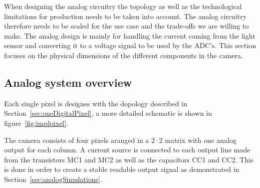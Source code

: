 
When designing the analog circuitry the topology as well as the technological limitations for production needs to be taken into account. The analog circuitry therefore needs to be scaled for the use case and the trade-offs we are willing to make.
The analog design is mainly for handling the current coming from the light sensor and converting it to a voltage signal to be used by the ADC's.
This section focuses on the physical dimensions of the different components in the camera.

\subsection{Analog system overview}

Each single pixel is designes with the dopology described in Section~\ref{sec:oneDigitalPixel}, a more detailed schematic is shown in figure~\ref{fig:implpixel}.

The camera consists of four pixels aranged in a $2 \cdot 2 $ matrix with one analog output for each column.
A current source is connected to each output line made from the transistors MC1 and MC2 as well as the capacitors CC1 and CC2.
This is done in order to create a stable readable output signal as demonstrated in Section~\ref{sec:analogSimulations}.

